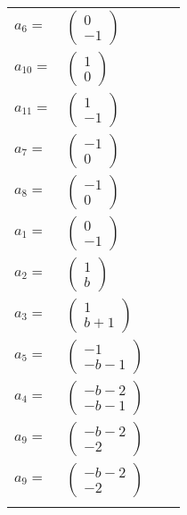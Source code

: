 \documentclass[1p]{elsarticle_modified}
\theoremstyle{definition}
\begin{document}
\begin{tabular}{m{7pt} m{180pt} m{7pt} m{180pt} }
\flushright $a_{6}=$&$\begin{pmatrix}0\\-1\end{pmatrix}$ \\
\flushright $a_{10}=$&$\begin{pmatrix}1\\0\end{pmatrix}$ \\
\flushright $a_{11}=$&$\begin{pmatrix}1\\-1\end{pmatrix}$ \\
\flushright $a_{7}=$&$\begin{pmatrix}-1\\0\end{pmatrix}$ \\
\flushright $a_{8}=$&$\begin{pmatrix}-1\\0\end{pmatrix}$ \\
\flushright $a_{1}=$&$\begin{pmatrix}0\\-1\end{pmatrix}$ \\
\flushright $a_{2}=$&$\begin{pmatrix}1\\b\end{pmatrix}$ \\
\flushright $a_{3}=$&$\begin{pmatrix}1\\b+1\end{pmatrix}$ \\
\flushright $a_{5}=$&$\begin{pmatrix}-1\\- b-1\end{pmatrix}$ \\
\flushright $a_{4}=$&$\begin{pmatrix}- b-2\\- b-1\end{pmatrix}$ \\
\flushright $a_{9}=$&$\begin{pmatrix}- b-2\\-2\end{pmatrix}$\\ \flushright $a_{9}=$&$\begin{pmatrix}- b-2\\-2\end{pmatrix}$\\&\end{tabular}
\end{document}
